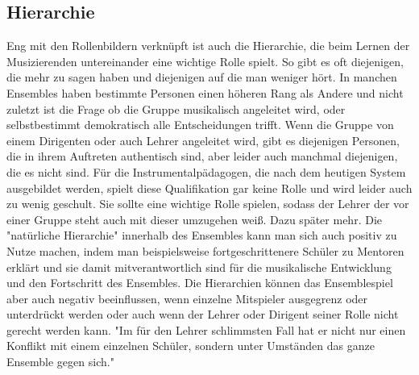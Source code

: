 \subsection{Hierarchie}
Eng mit den Rollenbildern verknüpft ist auch die Hierarchie, die beim Lernen der
Musizierenden untereinander eine wichtige Rolle spielt. So gibt es oft
diejenigen, die mehr zu sagen haben und diejenigen auf die man weniger hört. In
manchen Ensembles haben bestimmte Personen einen höheren Rang als Andere und
nicht zuletzt ist die Frage ob die Gruppe musikalisch angeleitet wird, oder
selbstbestimmt demokratisch alle Entscheidungen trifft. Wenn die Gruppe von
einem Dirigenten oder auch Lehrer angeleitet wird, gibt es diejenigen Personen,
die in ihrem Auftreten authentisch sind, aber leider auch manchmal diejenigen,
die es nicht sind. Für die Instrumentalpädagogen, die nach dem heutigen System
ausgebildet werden, spielt diese Qualifikation gar keine Rolle und wird leider
auch zu wenig geschult. Sie sollte eine wichtige Rolle spielen, sodass der
Lehrer der vor einer Gruppe steht auch mit dieser umzugehen weiß. Dazu später
mehr. Die "natürliche Hierarchie" innerhalb des Ensembles kann man sich auch
positiv zu Nutze machen, indem man beispielsweise fortgeschrittenere Schüler zu
Mentoren erklärt und sie damit mitverantwortlich sind für die musikalische
Entwicklung und den Fortschritt des
Ensembles.\autocite[95]{doerne:umfassend_musizieren} Die Hierarchien können das
Ensemblespiel aber auch negativ beeinflussen, wenn einzelne Mitspieler
ausgegrenz oder unterdrückt werden oder auch wenn der Lehrer oder Dirigent
seiner Rolle nicht gerecht werden kann. "Im für den Lehrer schlimmsten Fall hat
er nicht nur einen Konflikt mit einem einzelnen Schüler, sondern unter Umständen
das ganze Ensemble gegen sich." \autocite[94]{mitzscherlich:musikpsychologie}


